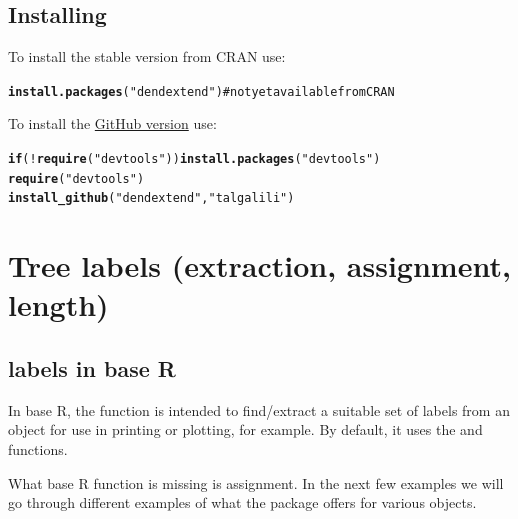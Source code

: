 \documentclass[shortnames,nojss,article]{jss}\usepackage{graphicx, color}
\makeatletter
\newcommand{\hlfunctioncall}[1]{\textcolor[rgb]{0.501960784313725,0,0.329411764705882}{\textbf{#1}}}%
\newcommand{\hlstring}[1]{\textcolor[rgb]{0.6,0.6,1}{#1}}%
\newenvironment{kframe}{%
 \def\at@end@of@kframe{}%
 \ifinner\ifhmode%
  \def\at@end@of@kframe{\end{minipage}}%
  \begin{minipage}{\columnwidth}%
 \fi\fi%
 \def\FrameCommand##1{\hskip\@totalleftmargin \hskip-\fboxsep
 \colorbox{shadecolor}{##1}\hskip-\fboxsep
     \hskip-\linewidth \hskip-\@totalleftmargin \hskip\columnwidth}%
 \MakeFramed {\advance\hsize-\width
   \@totalleftmargin\z@ \linewidth\hsize
   \@setminipage}}%
 {\par\unskip\endMakeFramed%
 \at@end@of@kframe}
\newenvironment{knitrout}{}{} %
\makeatother
\begin{document}
\subsection{Installing }

To install the stable version from CRAN use:

\begin{knitrout}
\color{fgcolor}\begin{kframe}
\begin{alltt}
\hlfunctioncall{install.packages}(\hlstring{"dendextend"})  # not yet available from CRAN
\end{alltt}
\end{kframe}
\end{knitrout}



To install the \href{https://github.com/talgalili/dendextend}{GitHub version} use:

\begin{knitrout}
\color{fgcolor}\begin{kframe}
\begin{alltt}
\hlfunctioncall{if} (!\hlfunctioncall{require}(\hlstring{"devtools"})) \hlfunctioncall{install.packages}(\hlstring{"devtools"})
\hlfunctioncall{require}(\hlstring{"devtools"})
\hlfunctioncall{install_github}(\hlstring{"dendextend"}, \hlstring{"talgalili"})
\end{alltt}
\end{kframe}
\end{knitrout}



\section{Tree labels (extraction, assignment, length)}


\subsection{labels in base R}

In base R, the  function is intended to find/extract a suitable set of labels from an object for use in printing or plotting, for example. By default, it uses the  and  functions.

What base R  function is missing is assignment. In the next few examples we will go through different examples of what the  package offers for various objects.
\end{document}

